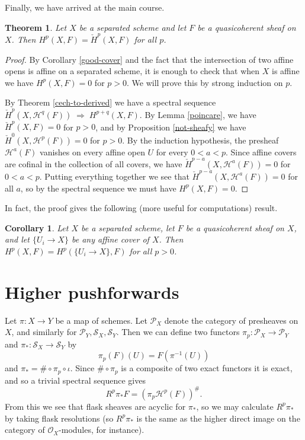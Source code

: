 \documentclass[letterpaper,11pt]{article}
\newtheorem{thm}{Theorem}
\newtheorem{cor}{Corollary}
\theoremstyle{definition}
\theoremstyle{remark}
\begin{document}
Finally, we have arrived at the main course.

\begin{thm}\label{cech-to-sheaf} Let $X$ be a separated scheme and let $F$ be a quasicoherent sheaf on $X$. Then $H^p(X,F) = \check{H}^p(X,F)$ for all $p$.
\end{thm}
\begin{proof} By Corollary \ref{good-cover} and the fact that the intersection of two affine opens is affine on a separated scheme, it is enough to check that when $X$ is affine we have $H^p(X,F) = 0$ for $p > 0$. We will prove this by strong induction on $p$.

By Theorem \ref{cech-to-derived} we have a spectral sequence $\check{H}^p(X,\mathcal{H}^q(F))\;\Rightarrow\;H^{p+q}(X,F)$. By Lemma \ref{poincare}, we have $\check{H}^p(X,F) = 0$ for $p>0$, and by Proposition \ref{not-sheafy} we have $\check{H}^0(X,\mathcal{H}^p(F)) = 0$ for $p > 0$. By the induction hypothesis, the presheaf $\mathcal{H}^a(F)$ vanishes on every affine open $U$ for every $0 < a < p$. Since affine covers are cofinal in the collection of all covers, we have $\check{H}^{p-a}(X,\mathcal{H}^a(F)) = 0$ for $0 < a < p$. Putting everything together we see that $\check{H}^{p-a}(X,\mathcal{H}^a(F)) = 0$ for all $a$, so by the spectral sequence we must have $H^p(X,F) = 0$.
\end{proof}

In fact, the proof gives the following (more useful for computations) result.

\begin{cor} Let $X$ be a separated scheme, let $F$ be a quasicoherent sheaf on $X$, and let $\{U_i\rightarrow X\}$ be any affine cover of $X$. Then $H^p(X,F) = H^p(\{U_i\rightarrow X\},F)$ for all $p > 0$.
\end{cor}

\section{Higher pushforwards}

Let $\pi : X \rightarrow Y$ be a map of schemes. Let $\mathcal{P}_X$ denote the category of presheaves on $X$, and similarly for $\mathcal{P}_Y, \mathcal{S}_X, \mathcal{S}_Y$. Then we can define two functors $\pi_p : \mathcal{P}_X \rightarrow \mathcal{P}_Y$ and $\pi_* : \mathcal{S}_X \rightarrow \mathcal{S}_Y$ by
\[
\pi_p(F)(U) = F(\pi^{-1}(U))
\]
and $\pi_* = \#\circ\pi_p\circ\iota$. Since $\#\circ\pi_p$ is a composite of two exact functors it is exact, and so a trivial spectral sequence gives
\[
R^p\pi_*F = (\pi_p\mathcal{H}^p(F))^\#.
\]
From this we see that flask sheaves are acyclic for $\pi_*$, so we may calculate $R^p\pi_*$ by taking flask resolutions (so $R^p\pi_*$ is the same as the higher direct image on the category of $\mathcal{O}_X$-modules, for instance).
\end{document}
